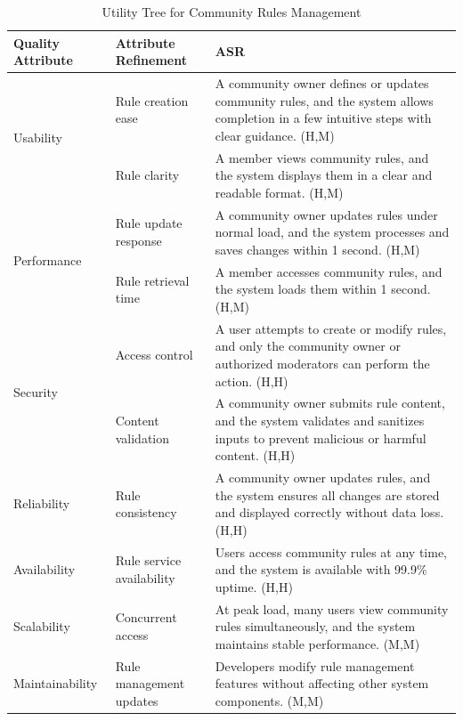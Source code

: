 \documentclass{article}
\begin{document}
\begin{table}[H]
\centering
\caption{Utility Tree for Community Rules Management}
\begin{tabular}{|p{3cm}|p{4cm}|p{7cm}|}
\hline
\textbf{Quality Attribute} & \textbf{Attribute Refinement} & \textbf{ASR} \\
\hline

\multirow{2}{*}{Usability}
& Rule creation ease
& A community owner defines or updates community rules, and the system allows completion in a few intuitive steps with clear guidance. (H,M) \\
\cline{2-3}
& Rule clarity
& A member views community rules, and the system displays them in a clear and readable format. (H,M) \\
\hline

\multirow{2}{*}{Performance}
& Rule update response
& A community owner updates rules under normal load, and the system processes and saves changes within 1 second. (H,M) \\
\cline{2-3}
& Rule retrieval time
& A member accesses community rules, and the system loads them within 1 second. (H,M) \\
\hline

\multirow{2}{*}{Security}
& Access control
& A user attempts to create or modify rules, and only the community owner or authorized moderators can perform the action. (H,H) \\
\cline{2-3}
& Content validation
& A community owner submits rule content, and the system validates and sanitizes inputs to prevent malicious or harmful content. (H,H) \\
\hline

Reliability
& Rule consistency
& A community owner updates rules, and the system ensures all changes are stored and displayed correctly without data loss. (H,H) \\
\hline

Availability
& Rule service availability
& Users access community rules at any time, and the system is available with 99.9\% uptime. (H,H) \\
\hline

Scalability
& Concurrent access
& At peak load, many users view community rules simultaneously, and the system maintains stable performance. (M,M) \\
\hline

Maintainability
& Rule management updates
& Developers modify rule management features without affecting other system components. (M,M) \\
\hline


\end{tabular}
\end{table}
\end{document}
